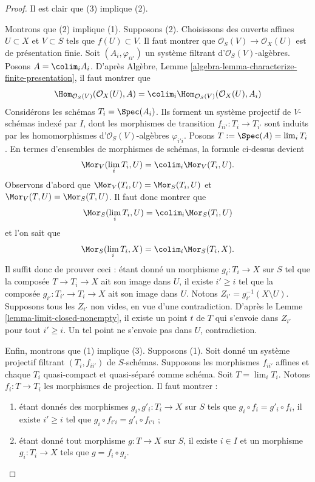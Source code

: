 \begin{proof}
Il est clair que (3) implique (2).

\medskip\noindent
Montrons que (2) implique (1). Supposons (2). Choisissons des ouverts affines
$U \subset X$ et $V \subset S$ tels que $f(U) \subset V$. Il faut montrer
que $\mathcal{O}_S(V) \to \mathcal{O}_X(U)$ est de présentation finie.
Soit $(A_i, \varphi_{ii'})$ un système filtrant
d'$\mathcal{O}_S(V)$-algèbres. Posons $A = \colim_i A_i$. D'après Algèbre,
Lemme \ref{algebra-lemma-characterize-finite-presentation}, il faut montrer
que
$$
\Hom_{\mathcal{O}_S(V)}(\mathcal{O}_X(U), A) =
\colim_i \Hom_{\mathcal{O}_S(V)}(\mathcal{O}_X(U), A_i)
$$
Considérons les schémas $T_i = \Spec(A_i)$. Ils forment un système projectif
de $V$-schémas indexé par $I$, dont les morphismes de transition
$f_{ii'} : T_i \to T_{i'}$ sont induits par les homomorphismes
d'$\mathcal{O}_S(V)$-algèbres $\varphi_{i'i}$. Posons
$T := \Spec(A) = \lim_i T_i$. En termes d'ensembles de morphismes de
schémas, la formule ci-dessus devient
$$
\Mor_V(\lim_i T_i, U) =
\colim_i \Mor_V(T_i, U).
$$
Observons d'abord que
$\Mor_V(T_i, U) = \Mor_S(T_i, U)$
et
$\Mor_V(T, U) = \Mor_S(T, U)$.
Il faut donc montrer que
$$
\Mor_S(\lim_i T_i, U) =
\colim_i \Mor_S(T_i, U)
$$
et l'on sait que
$$
\Mor_S(\lim_i T_i, X) =
\colim_i \Mor_S(T_i, X).
$$
Il suffit donc de prouver ceci : étant donné un morphisme
$g_i : T_i \to X$ sur $S$ tel que la composée $T \to T_i \to X$ ait son
image dans $U$, il existe $i' \geq i$ tel que la composée
$g_{i'} : T_{i'} \to T_i \to X$ ait son image dans $U$. Notons
$Z_{i'} = g_{i'}^{-1}(X \setminus U)$. Supposons tous les $Z_{i'}$ non vides,
en vue d'une contradiction. D'après le
Lemme \ref{lemma-limit-closed-nonempty}, il existe un point $t$ de $T$ qui
s'envoie dans $Z_{i'}$ pour tout $i' \geq i$. Un tel point ne s'envoie pas
dans $U$, contradiction.

\medskip\noindent
Enfin, montrons que (1) implique (3). Supposons (1). Soit donné un système
projectif filtrant $(T_i, f_{ii'})$ de $S$-schémas. Supposons les morphismes
$f_{ii'}$ affines et chaque $T_i$ quasi-compact et quasi-séparé comme schéma.
Soit $T = \lim_i T_i$. Notons $f_i : T \to T_i$ les morphismes de
projection. Il faut montrer :
\begin{enumerate}
\item[(a)] étant donnés des morphismes $g_i, g'_i : T_i \to X$ sur $S$ tels
que $g_i \circ f_i = g'_i \circ f_i$, il existe $i' \geq i$ tel que
$g_i \circ f_{i'i} = g'_i \circ f_{i'i}$ ;
\item[(b)] étant donné tout morphisme $g : T \to X$ sur $S$, il existe
$i \in I$ et un morphisme $g_i : T_i \to X$ tels que
$g = f_i \circ g_i$.
\end{enumerate}


\end{proof}
